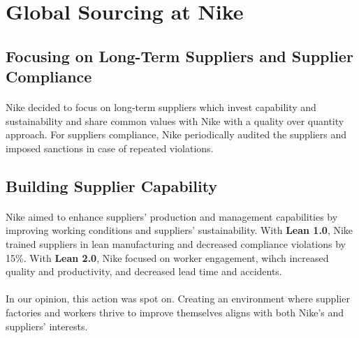 \section{Global Sourcing at Nike}

\subsection{Focusing on Long-Term Suppliers and Supplier Compliance}

\paragraph{} Nike decided to focus on long-term suppliers which invest capability and sustainability and share common values with Nike with a quality over quantity approach. For suppliers compliance, Nike periodically audited the suppliers and imposed sanctions in case of repeated violations.

\subsection{Building Supplier Capability}

\paragraph{} Nike aimed to enhance suppliers' production and management capabilities by improving working conditions and suppliers' sustainability. With \textbf{Lean 1.0}, Nike trained suppliers in lean manufacturing and decreased compliance violations by 15\%. With \textbf{Lean 2.0}, Nike focused on worker engagement, wihch increased quality and productivity, and decreased lead time and accidents.

\paragraph{} In our opinion, this action was spot on. Creating an environment where supplier factories and workers thrive to improve themselves aligns with both Nike's and suppliers' interests.